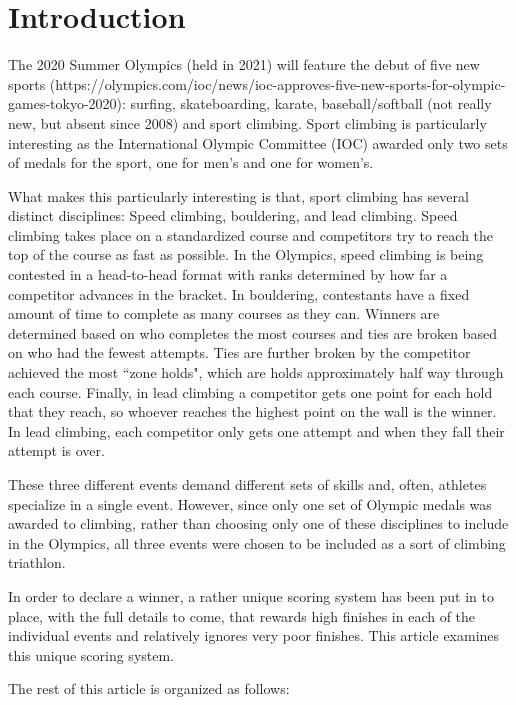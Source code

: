 \documentclass{article}\usepackage[]{graphicx}\usepackage[]{color}
\begin{document}
\section{Introduction}
The 2020 Summer Olympics (held in 2021) will feature the debut of five new sports (https://olympics.com/ioc/news/ioc-approves-five-new-sports-for-olympic-games-tokyo-2020): surfing, skateboarding, karate, baseball/softball (not really new, but absent since 2008) and sport climbing.  Sport climbing is particularly interesting as the International Olympic Committee (IOC) awarded only two sets of medals for the sport, one for men's and one for women's.  

What makes this particularly interesting is that, sport climbing has several distinct disciplines: Speed climbing, bouldering, and lead climbing.  Speed climbing takes place on a standardized course and competitors try to reach the top of the course as fast as possible.  In the Olympics, speed climbing is being contested in a head-to-head format with ranks determined by how far a competitor advances in the bracket.   In bouldering, contestants have a fixed amount of time to complete as many courses as they can.  Winners are determined based on who completes the most courses and ties are broken based on who had the fewest attempts.  Ties are further broken by the competitor achieved the most ``zone holds", which are holds approximately half way through each course.  Finally, in lead climbing a competitor gets one point for each hold that they reach, so whoever reaches the highest point on the wall is the winner.  In lead climbing, each competitor only gets one attempt and when they fall their attempt is over.  %

These three different events demand different sets of skills and, often, athletes specialize in a single event.  However, since only one set of Olympic medals was awarded to climbing, rather than choosing only one of these disciplines to include in the Olympics, all three events were chosen to be included as a sort of climbing triathlon.  

In order to declare a winner, a rather unique scoring system has been put in to place, with the full details to come, that rewards high finishes in each of the individual events and relatively ignores very poor finishes.  This article examines this unique scoring system. 

The rest of this article is organized as follows: 
\end{document}
